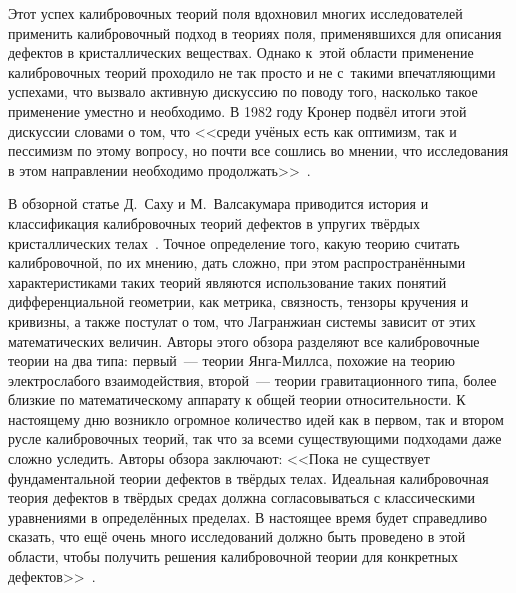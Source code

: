 \documentclass[a4paper, 14pt, titlepage]{extarticle}
\begin{document}
  Этот успех калибровочных теорий поля вдохновил многих исследователей применить калибровочный
  подход в теориях поля, применявшихся для описания дефектов в кристаллических веществах. Однако
  к~этой области применение калибровочных теорий проходило не так просто и не с~такими впечатляющими
  успехами, что вызвало активную дискуссию по поводу того, насколько такое применение уместно и
  необходимо. В 1982 году Кронер подвёл итоги этой дискуссии словами о том, что <<среди учёных есть
  как оптимизм, так и пессимизм по этому вопросу, но почти все сошлись во мнении, что исследования в
  этом направлении необходимо продолжать>>~\cite{kroner-gauge}.

  В обзорной статье Д.~Саху и М.~Валсакумара приводится история и классификация калибровочных теорий
  дефектов в упругих твёрдых кристаллических телах~\cite{sahoo-gauge-I,sahoo-gauge-II}. Точное
  определение того, какую теорию считать калибровочной, по их мнению, дать сложно, при этом распространёнными характеристиками
  таких теорий являются использование таких понятий дифференциальной геометрии, как метрика,
  связность, тензоры кручения и кривизны, а также постулат о том, что Лагранжиан системы зависит от
  этих математических величин. Авторы этого обзора разделяют все калибровочные теории на два типа:
  первый~--- теории Янга-Миллса, похожие на теорию электрослабого взаимодействия, второй~--- теории
  гравитационного типа, более близкие по математическому аппарату к общей теории относительности.
  К настоящему дню возникло огромное количество идей как в первом, так и втором русле калибровочных
  теорий, так что за всеми существующими подходами даже сложно уследить. Авторы обзора заключают:
  <<Пока не существует фундаментальной теории дефектов в твёрдых телах. Идеальная калибровочная
  теория дефектов в твёрдых средах должна согласовываться с классическими уравнениями в определённых
  пределах. В настоящее время будет справедливо сказать, что ещё очень много исследований должно
  быть проведено в этой области, чтобы получить решения калибровочной теории для конкретных
  дефектов>>~\cite{sahoo-gauge-I}.
\end{document}
